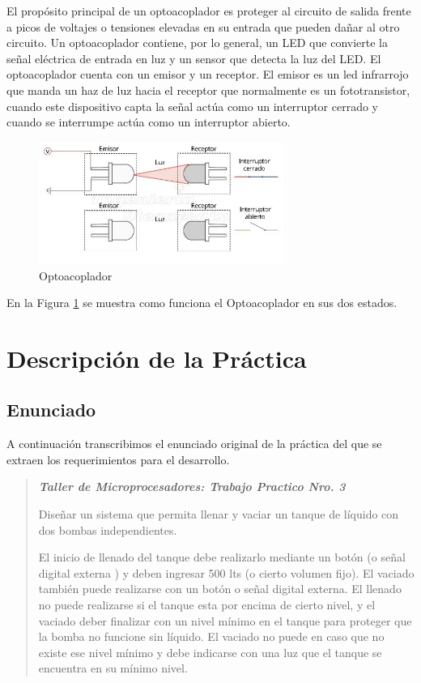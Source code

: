 \documentclass[a4paper]{article}
\begin{document}
El propósito principal de un optoacoplador es proteger al circuito de salida frente a picos de voltajes o tensiones elevadas en su entrada que pueden dañar al otro circuito. Un optoacoplador contiene, por lo general, un LED que convierte la señal eléctrica de entrada en luz y un sensor que detecta la luz del LED.
El optoacoplador cuenta con un emisor y un receptor. El emisor es un led infrarrojo que manda un haz de luz hacia el receptor que normalmente es un fototransistor, cuando este dispositivo capta la señal actúa como un interruptor cerrado y cuando se interrumpe actúa como un interruptor abierto.

\begin{figure}[h]\centering
    \includegraphics[height=4cm]{Optoacoplador.png}
    \caption{Optoacoplador}
    \label{fig:Optoacoplador}
\end{figure}

En la Figura \ref{fig:Optoacoplador} se muestra como funciona el Optoacoplador en sus dos estados.

\section{Descripción de la Práctica}

\subsection{Enunciado}

A continuación transcribimos el enunciado original de la práctica del
que se extraen los requerimientos para el desarrollo.

\begin{quotation}

    \begin{center}\textit{\textbf{%
        Taller de Microprocesadores: Trabajo Practico Nro. 3%
    }}\end{center}\vspace{1em}

    Diseñar un sistema que permita llenar y vaciar un tanque de líquido 
    con dos bombas independientes. 

    El inicio de llenado del tanque debe realizarlo mediante un botón 
    (o señal digital externa ) y deben ingresar 500 lts (o cierto volumen 
    fijo). El vaciado también puede realizarse con un botón o señal 
    digital externa. El llenado no puede realizarse si el tanque esta por 
    encima de cierto nivel, y el vaciado deber finalizar con un nivel 
    mínimo en el tanque para proteger que la bomba no funcione sin 
    líquido. El vaciado no puede en caso que no existe ese nivel mínimo y 
    debe indicarse con una luz que el tanque se encuentra en su mínimo 
    nivel.

\end{quotation}
\end{document}
